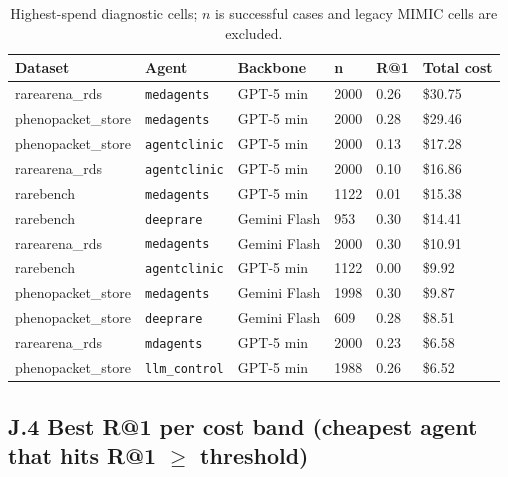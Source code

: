 \begin{table}[t]
\centering\scriptsize\setlength{\tabcolsep}{3.5pt}
\caption{Highest-spend diagnostic cells; \(n\) is successful cases and legacy MIMIC cells are excluded.}\label{tbl:jcosttop}
\begin{tabular}{@{}
llllll@{}}
\toprule
Dataset & Agent & Backbone & n & R@1 & Total cost \\
\midrule
rarearena\_rds & \texttt{medagents} & GPT-5 min & 2000 & 0.26 & \$30.75 \\
phenopacket\_store & \texttt{medagents} & GPT-5 min & 2000 & 0.28 & \$29.46 \\
phenopacket\_store & \texttt{agent\allowbreak clinic} & GPT-5 min & 2000 & 0.13 & \$17.28 \\
rarearena\_rds & \texttt{agent\allowbreak clinic} & GPT-5 min & 2000 & 0.10 & \$16.86 \\
rarebench & \texttt{medagents} & GPT-5 min & 1122 & 0.01 & \$15.38 \\
rarebench & \texttt{deeprare} & Gemini Flash & 953 & 0.30 & \$14.41 \\
rarearena\_rds & \texttt{medagents} & Gemini Flash & 2000 & 0.30 & \$10.91 \\
rarebench & \texttt{agent\allowbreak clinic} & GPT-5 min & 1122 & 0.00 & \$9.92 \\
phenopacket\_store & \texttt{medagents} & Gemini Flash & 1998 & 0.30 & \$9.87 \\
phenopacket\_store & \texttt{deeprare} & Gemini Flash & 609 & 0.28 & \$8.51 \\
rarearena\_rds & \texttt{mdagents} & GPT-5 min & 2000 & 0.23 & \$6.58 \\
phenopacket\_store & \texttt{llm\_control} & GPT-5 min & 1988 & 0.26 & \$6.52 \\
\bottomrule
\end{tabular}
\end{table}

\subsection{J.4 Best R@1 per cost band (cheapest agent that hits R@1 \ensuremath{\geq} threshold)}\label{j.4-best-r1-per-cost-band-cheapest-agent-that-hits-r1-threshold}


